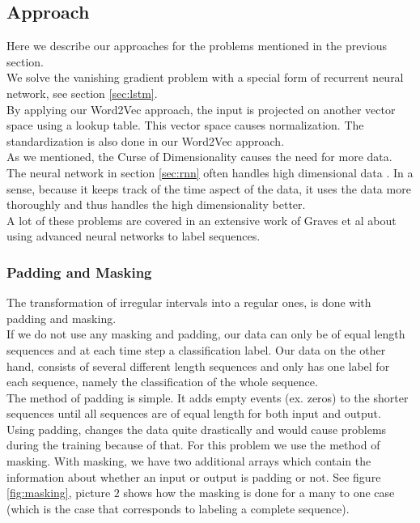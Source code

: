 \subsection{Approach}

Here we describe our approaches for the problems mentioned in the previous section. \\
We solve the vanishing gradient problem with a special form of recurrent neural network, see section \ref{sec:lstm}. \\
By applying our Word2Vec approach, the input is projected on another vector space using a lookup table. This vector space causes normalization. The standardization is also done in our Word2Vec approach. \\
As we mentioned, the Curse of Dimensionality causes the need for more data. The neural network in section \ref{sec:rnn} often handles high dimensional data \cite{nn1:article} \cite{nn2:article} \cite{nn3:article} \cite{nn4:article}. In a sense, because it keeps track of the time aspect of the data, it uses the data more thoroughly and thus handles the high dimensionality better. \\

A lot of these problems are covered in an extensive work of Graves et al \cite{gravesLstm:thesis} about using advanced neural networks to label sequences.

\subsubsection{Padding and Masking}
The transformation of irregular intervals into a regular ones, is done with padding and masking. \\

If we do not use any masking and padding, our data can only be of equal length sequences and at each time step a classification label. Our data on the other hand, consists of several different length sequences and only has one label for each sequence, namely the classification of the whole sequence. \\

The method of padding is simple. It adds empty events (ex. zeros) to the shorter sequences until all sequences are of equal length for both input and output. \\
Using padding, changes the data quite drastically and would cause problems during the training because of that. For this problem we use the method of masking. With masking, we have two additional arrays which contain the information about whether an input or output is padding or not. See figure \ref{fig:masking}, picture $2$ shows how the masking is done for a many to one case (which is the case that corresponds to labeling a complete sequence). 

